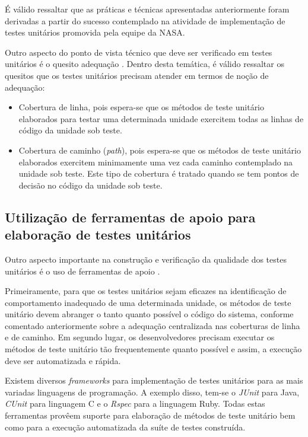 É válido ressaltar que as práticas e técnicas apresentadas anteriormente foram derivadas a partir do sucesso contemplado na atividade de implementação de testes unitários promovida pela equipe da NASA.

Outro aspecto do ponto de vista técnico que deve ser verificado em testes unitários é o quesito adequação \cite{adequacao}. Dentro desta temática, é válido ressaltar os quesitos que os testes unitários precisam atender em termos de noção de adequação:

\begin{itemize}
	\item Cobertura de linha, pois espera-se que os métodos de teste unitário elaborados para testar uma determinada unidade exercitem todas as linhas de código da unidade sob teste.
	\item Cobertura de caminho (\textit{path}), pois espera-se que os métodos de teste unitário elaborados exercitem minimamente uma vez cada caminho contemplado na unidade sob teste. Este tipo de cobertura é tratado quando se tem pontos de decisão no código da unidade sob teste.
\end{itemize}

\subsection{Utilização de ferramentas de apoio para elaboração de testes unitários}

Outro aspecto importante na construção e verificação da qualidade dos testes unitários é o uso de ferramentas de apoio \cite{feedback}.

Primeiramente, para que os testes unitários sejam eficazes na identificação de comportamento inadequado de uma determinada unidade, os métodos de teste unitário devem abranger o tanto quanto possível o código do sistema, conforme comentado anteriormente sobre a adequação centralizada nas coberturas de linha e de caminho. Em segundo lugar, os desenvolvedores precisam executar os métodos de teste unitário tão frequentemente quanto possível e assim, a execução deve ser automatizada e rápida.

Existem diversos \textit{frameworks} para implementação de testes unitários para as mais variadas linguagens de programação. A exemplo disso, tem-se o \textit{JUnit} para Java, \textit{CUnit} para linguagem C e o \textit{Rspec} para a linguagem Ruby. Todas estas ferramentas provêem suporte para elaboração de métodos de teste unitário bem como para a execução automatizada da suíte de testes construída.

